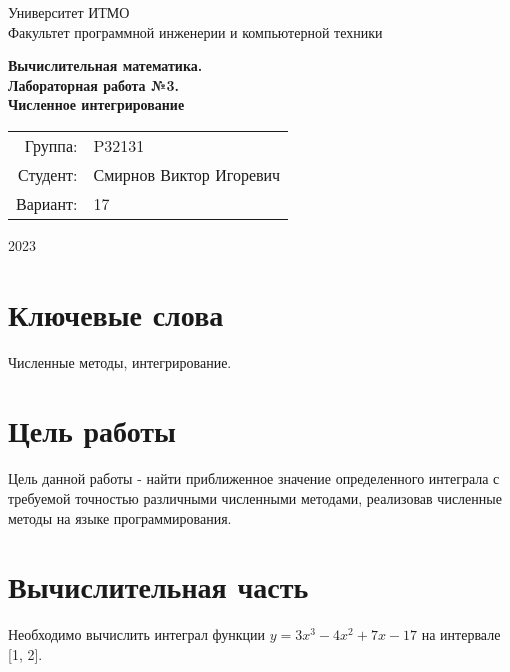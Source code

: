 \documentclass{article}
\begin{document}
\begin{titlepage}
    \begin{center}
        \begin{spacing}{1.4}
            \large{Университет ИТМО} \\
            \large{Факультет программной инженерии и компьютерной техники} \\
        \end{spacing}
        \vfill
        \textbf{
            \huge{Вычислительная математика.} \\
            \huge{Лабораторная работа №3.} \\
            \huge{Численное интегрирование} \\
        }
    \end{center}
    \vfill
    \begin{center}
        \begin{tabular}{r l}
            Группа:  & P32131                  \\
            Студент: & Смирнов Виктор Игоревич \\
            Вариант: & 17                      \\
        \end{tabular}
    \end{center}
    \vfill
    \begin{center}
        \begin{large}
            2023
        \end{large}
    \end{center}
\end{titlepage}

\section*{Ключевые слова}
Численные методы, интегрирование.

\section{Цель работы}
Цель данной работы - найти приближенное значение определенного
интеграла с требуемой точностью различными численными методами,
реализовав численные методы на языке программирования.

\section{Вычислительная часть}
Необходимо вычислить интеграл функции
$y = 3 x ^ 3 - 4 x ^ 2 + 7 x - 17$ на интервале
[1, 2].
\end{document}

